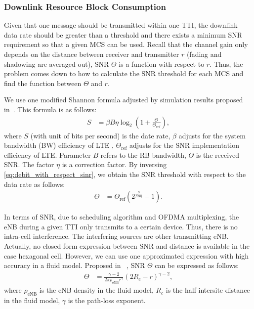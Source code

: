 

\subsubsection{Downlink Resource Block Consumption}
Given that one message should be transmitted within one TTI, the downlink data rate should be greater than a threshold and there exists a minimum SNR requirement so that a given MCS can be used. Recall that the channel gain only depends on the distance between receiver and transmitter $r$ (fading and shadowing are averaged out), SNR $\Theta$ is a function with respect to $r$. Thus, the problem comes down to how to calculate the SNR threshold for each MCS and find the function between $\Theta$ and $r$. 

We use one modified Shannon formula adjusted by simulation results proposed in~\cite{mogensen2007lte}. This formula is as follows:
\begin{align}
	\label{eq:debit_with_respect_sinr}
	S &= \beta B \eta  \log_2 \left( 1 + \frac{\Theta}{\Theta_{\text{ref}}} \right),
\end{align}
where $S$ (with unit of bits per second) is the date rate, $\beta$ adjusts for the system bandwidth (BW) efficiency of LTE , $\Theta_{\text{ref}}$ adjusts for the SNR implementation efficiency of LTE. Parameter $B$ refers to the RB bandwidth, $\Theta$ is the received SNR. The factor $\eta$ is a correction factor. By inversing \eqref{eq:debit_with_respect_sinr}, we obtain the SNR threshold with respect to the data rate as follows:
\begin{align}
	\label{eq:sinr_threshold}
	\Theta &= \Theta_{\text{ref}} \left(  2^{\frac{S}{\beta B \eta  }} - 1 \right).
\end{align}

In terms of SNR, due to scheduling algorithm and OFDMA multiplexing, the eNB during a given TTI only transmits to a certain device. Thus, there is no intra-cell interference. The interfering sources are other transmitting eNB. 
Actually, no closed form expression between SNR and distance is available in the case hexagonal cell. However, we can use one approximated expression with high accuracy in a fluid model. Proposed in ~\cite{kelif2010fluid}, SNR $\Theta$ can be expressed as follows:
\begin{align}
	\label{eq:snr_r_formula_in_fluid_model}
	\Theta &= \frac{\gamma-2}{2\pi \rho_{\text{eNB}} r^{\gamma}} (2R_c - r)^{\gamma - 2},
\end{align}
where $\rho_{\text{eNB}}$ is the eNB density in the fluid model, $R_c$ is the half intersite distance in the fluid model, $\gamma$ is the path-loss exponent.

